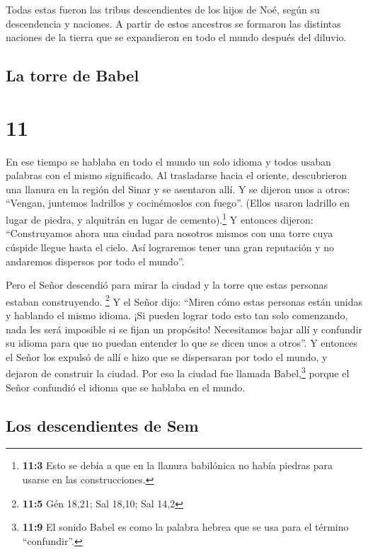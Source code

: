  Todas estas fueron las tribus descendientes de los hijos
de Noé, según su descendencia y naciones. A partir de estos ancestros se
formaron las distintas naciones de la tierra que se expandieron en todo
el mundo después del diluvio.

\hypertarget{la-torre-de-babel}{%
\subsection{La torre de Babel}\label{la-torre-de-babel}}

\hypertarget{section-10}{%
\section{11}\label{section-10}}

 En ese tiempo se hablaba en todo el mundo un solo idioma
y todos usaban palabras con el mismo significado.  Al
trasladarse hacia el oriente, descubrieron una llanura en la región del
Sinar y se asentaron allí.  Y se dijeron unos a otros:
``Vengan, juntemos ladrillos y cocinémoslos con fuego''. (Ellos usaron
ladrillo en lugar de piedra, y alquitrán en lugar de
cemento).\footnote{\textbf{11:3} Esto se debía a que en la llanura
  babilónica no había piedras para usarse en las construcciones.}
 Y entonces dijeron: ``Construyamos ahora una ciudad para
nosotros mismos con una torre cuya cúspide llegue hasta el cielo. Así
lograremos tener una gran reputación y no andaremos dispersos por todo
el mundo''.

 Pero el Señor descendió para mirar la ciudad y la torre
que estas personas estaban construyendo. \footnote{\textbf{11:5} Gén
  18,21; Sal 18,10; Sal 14,2}  Y el Señor dijo: ``Miren
cómo estas personas están unidas y hablando el mismo idioma. ¡Si pueden
lograr todo esto tan solo comenzando, nada les será imposible si se
fijan un propósito!  Necesitamos bajar allí y confundir su
idioma para que no puedan entender lo que se dicen unos a otros''.
 Y entonces el Señor los expulsó de allí e hizo que se
dispersaran por todo el mundo, y dejaron de construir la ciudad.
 Por eso la ciudad fue llamada Babel,\footnote{\textbf{11:9}
  El sonido Babel es como la palabra hebrea que se usa para el término
  ``confundir''.} porque el Señor confundió el idioma que se hablaba en
el mundo.

\hypertarget{los-descendientes-de-sem}{%
\subsection{Los descendientes de Sem}\label{los-descendientes-de-sem}}

